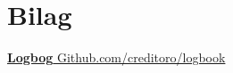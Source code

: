 \section{Bilag}

\href{https://github.com/creditoro/logbook}{\textbf{Logbog} Github.com/creditoro/logbook}
